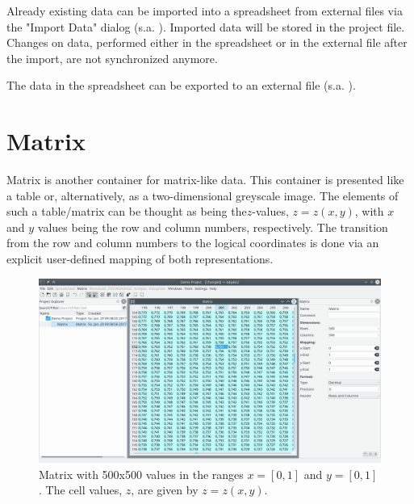 
Already existing data can be imported into a spreadsheet from external files via the "Import Data" dialog (s.a. ).
Imported data will be stored in the project file. Changes on data, performed either in the spreadsheet or in the external file after the import, are not synchronized anymore.

The data in the spreadsheet can be exported to an external file (s.a. ).



\section{Matrix}\label{sec:matrix}
Matrix is another container for matrix-like data. This container is presented like a table or, alternatively, as a two-dimensional greyscale image.
The elements of such a table/matrix can be thought as being the$z$-values, $z=z(x,y)$, with $x$ and $y$ values being the row and column numbers, respectively.
The transition from the row and column numbers to the logical coordinates is done via an explicit user-defined mapping of both representations.
\begin{figure}
\includegraphics[width=\textwidth]{images/matrix.png}
\caption{Matrix with 500x500 values in the ranges $x=[0,1]$ and $y=[0,1]$. The cell values, $z$, are given by $z=z(x,y)$.}
\end{figure}

